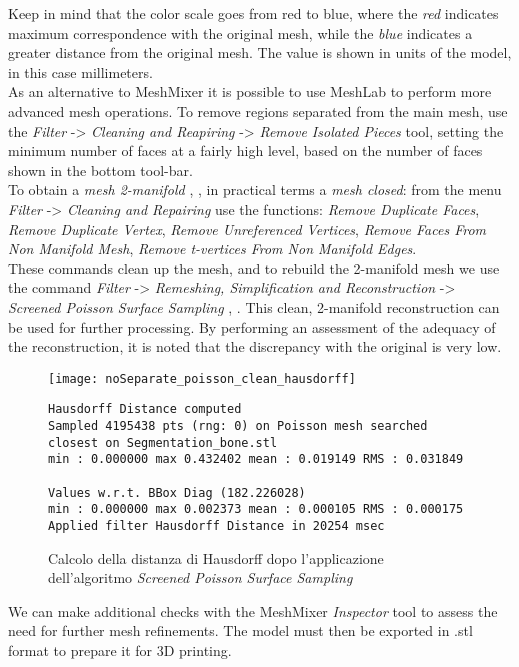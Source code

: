 Keep in mind that the color scale goes from red to blue, where the \emph{red} indicates maximum correspondence with the original mesh, while the \emph{blue} indicates a greater distance from the original mesh. The value is shown in units of the model, in this case millimeters. \\
As an alternative to MeshMixer it is possible to use MeshLab to perform more advanced mesh operations.
To remove regions separated from the main mesh, use the \emph{Filter} -> \emph{Cleaning and Reapiring} -> \emph{Remove Isolated Pieces} tool, setting the minimum number of faces at a fairly high level, based on the number of faces shown in the bottom tool-bar. \\
To obtain a \emph{mesh 2-manifold} \parencite{Reference92}, \parencite{Reference93}, in practical terms a \emph{mesh closed}: from the menu \emph{Filter} -> \emph{Cleaning and Repairing } use the functions: \emph{Remove Duplicate Faces}, \emph{Remove Duplicate Vertex}, \emph{Remove Unreferenced Vertices}, \emph{Remove Faces From Non Manifold Mesh}, \emph{Remove t-vertices From Non Manifold Edges}. \\ These commands clean up the mesh, and to rebuild the 2-manifold mesh we use the command \emph{Filter} -> \emph{Remeshing, Simplification and Reconstruction} -> \emph{Screened Poisson Surface Sampling} \parencite{Reference95}, \parencite{Reference96}. This clean, 2-manifold reconstruction can be used for further processing. By performing an assessment of the adequacy of the reconstruction, it is noted that the discrepancy with the original is very low.
\begin{figure}[h]
\centering
\texttt{[image: noSeparate\_poisson\_clean\_hausdorff]}
\caption[LoF entry]{Calcolo della distanza di Hausdorff dopo l'applicazione dell'algoritmo \emph{Screened Poisson Surface Sampling}}

\begin{lstlisting}
Hausdorff Distance computed
Sampled 4195438 pts (rng: 0) on Poisson mesh searched 
closest on Segmentation_bone.stl
min : 0.000000 max 0.432402 mean : 0.019149 RMS : 0.031849

Values w.r.t. BBox Diag (182.226028)
min : 0.000000 max 0.002373 mean : 0.000105 RMS : 0.000175 
Applied filter Hausdorff Distance in 20254 msec
\end{lstlisting}
\label{fig:noSeparate_poisson_clean_hausdorff}
\end{figure}

We can make additional checks with the MeshMixer \emph{Inspector} tool to assess the need for further mesh refinements.
The model must then be exported in .stl format to prepare it for 3D printing.
\newpage

